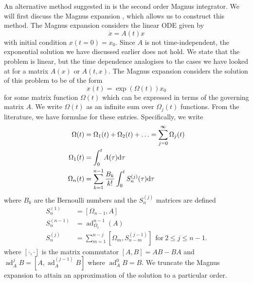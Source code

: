An alternative method suggested in \cite{blanes_pos_2022} is the second order Magnus integrator.
We will first discuss the Magnus expansion \cite{Magnus_1954, blanesmagnus2009}, which allows us to construct this method.
The Magnus expansion considers the linear ODE given by
\begin{equation*}
    \dot{x} = A(t)x
\end{equation*}
with initial condition $x(t=0) = x_0$.
Since $A$ is not time-independent, the exponential solution we have discussed earlier does not hold.
We state that the problem is linear, but the time dependence analogises to the cases we have looked at for a matrix $A(x)$ or $A(t,x)$.
The Magnus expansion considers the solution of this problem to be of the form
\begin{equation*}
    x(t) = \exp(\Omega(t))x_0
\end{equation*}
for some matrix function $\Omega(t)$ which can be expressed in terms of the governing matrix $A$.
We write $\Omega(t)$ as an infinite sum over $\Omega_j(t)$ functions.
From the literature, we have formulae for these entries.
Specifically, we write
\begin{equation*}
    \begin{aligned}
        \Omega(t) &= \Omega_1(t) + \Omega_2(t) + \mathellipsis = \sum_{j = 0}^{\infty} \Omega_j (t) \\
        \Omega_1(t) &= \int_{0}^{t} A(\tau) \mathrm{d}\tau \\
        \Omega_n(t) &= \sum_{k=1}^{n-1} \frac{B_k}{k!} \int_{0}^{t} S_n^{(j)}(\tau) \mathrm{d}\tau \\
    \end{aligned}
\end{equation*}
where $B_k$ are the Bernoulli numbers \cite{bernoulli} and the $S_n^{(j)}$ matrices are defined
\begin{equation*}
    \begin{aligned}
        S_n^{(1)} &= [\Omega_{n-1}, A] \\
        S_n^{(n-1)} &= \operatorname{ad}_{\Omega_1}^{n-1}(A) \\
        S_n^{(j)} &= \sum_{m=1}^{n-j} \left[ \Omega_m, S_{n-m}^{(j-1)} \right] ~~ \text{for}~ 2 \le j \le n-1.
    \end{aligned} 
\end{equation*}
where $\left[\cdot, \cdot\right]$ is the matrix commutator $[A,B] = AB-BA$ and $\operatorname{ad}_A^{j} B = [ A, \operatorname{ad}_A^{(j-1)}B ]$ where $\operatorname{ad}_A^0 B = B$.
We truncate the Magnus expansion to attain an approximation of the solution to a particular order.
